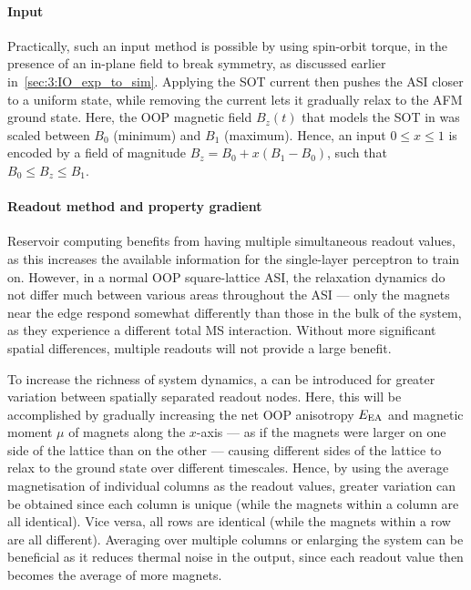 \paragraph{Input}
Practically, such an input method is possible by using spin-orbit torque, in the presence of an in-plane field to break symmetry, as discussed earlier in~\cref{sec:3:IO_exp_to_sim}.
Applying the SOT current then pushes the ASI closer to a uniform state, while removing the current lets it gradually relax to the AFM ground state.
Here, the OOP magnetic field $B_z(t)$ that models the SOT in \hotspice was scaled between $B_0$ (minimum) and $B_1$ (maximum).
Hence, an input $0 \leq x \leq 1$ is encoded by a field of magnitude $B_z = B_0 + x (B_1 - B_0)$, such that $B_0 \leq B_z \leq B_1$.

\paragraph{Readout method and property gradient}
Reservoir computing benefits from having multiple simultaneous readout values, as this increases the available information for the single-layer perceptron to train on.
However, in a normal OOP square-lattice ASI, the relaxation dynamics do not differ much between various areas throughout the ASI --- only the magnets near the edge respond somewhat differently than those in the bulk of the system, as they experience a different total MS interaction.
Without more significant spatial differences, multiple readouts will not provide a large benefit. \\\par
To increase the richness of system dynamics, a  can be introduced for greater variation between spatially separated readout nodes. %
Here, this will be accomplished by gradually increasing the net OOP anisotropy $E_\mathrm{EA}$ and magnetic moment $\mu$ of magnets along the $x$-axis --- as if the magnets were larger on one side of the lattice than on the other --- causing different sides of the lattice to relax to the ground state over different timescales.
Hence, by using the average magnetisation of individual columns as the readout values, greater variation can be obtained since each column is unique (while the magnets within a column are all identical).
Vice versa, all rows are identical (while the magnets within a row are all different).
Averaging over multiple columns or enlarging the system can be beneficial as it reduces thermal noise in the output, since each readout value then becomes the average of more magnets.

